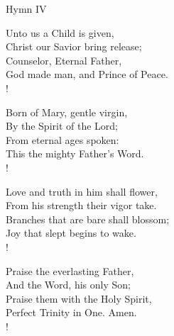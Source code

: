 Hymn IV
\begin{cverse}
Unto us a Child is given,\\
Christ our Savior bring release;\\
Counselor, Eternal Father,\\
God made man, and Prince of Peace.\\!

Born of Mary, gentle virgin,\\
By the Spirit of the Lord;\\
From eternal ages spoken:\\
This the mighty Father's Word.\\!

Love and truth in him shall flower,\\
From his strength their vigor take.\\
Branches that are bare shall blossom;\\
Joy that slept begins to wake.\\!

Praise the everlasting Father,\\
And the Word, his only Son;\\
Praise them with the Holy Spirit,\\
Perfect Trinity in One. Amen.\\!
\end{cverse}
